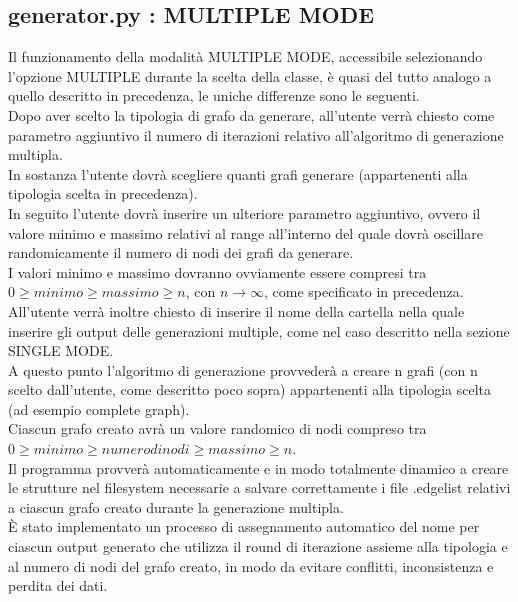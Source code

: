 \subsection{generator.py : MULTIPLE MODE}
\justify
Il funzionamento della modalità MULTIPLE MODE, accessibile selezionando l'opzione MULTIPLE durante la scelta della classe, è quasi del tutto analogo a quello descritto in precedenza, le uniche differenze sono le seguenti.\\

Dopo aver scelto la tipologia di grafo da generare, all'utente verrà chiesto come parametro aggiuntivo il numero di iterazioni relativo all'algoritmo di generazione multipla.\\
In sostanza l'utente dovrà scegliere quanti grafi generare (appartenenti alla tipologia scelta in precedenza).\\

In seguito l'utente dovrà inserire un ulteriore parametro aggiuntivo, ovvero il valore minimo e massimo relativi al range all'interno del quale dovrà oscillare randomicamente il numero di nodi dei grafi da generare.\\
I valori minimo e massimo dovranno ovviamente essere compresi tra \(0 \geq minimo \geq massimo \geq n\), con \(n\to\infty\), come specificato in precedenza.\\

All'utente verrà inoltre chiesto di inserire il nome della cartella nella quale inserire gli output delle generazioni multiple, come nel caso descritto nella sezione SINGLE MODE.\\

A questo punto l'algoritmo di generazione provvederà a creare n grafi (con n scelto dall'utente, come descritto poco sopra) appartenenti alla tipologia scelta (ad esempio complete graph).\\
Ciascun grafo creato avrà un valore randomico di nodi compreso tra \(0 \geq minimo \geq numero di nodi \geq massimo \geq n\).\\

Il programma provverà automaticamente e in modo totalmente dinamico a creare le strutture nel filesystem necessarie a salvare correttamente i file .edgelist relativi a ciascun grafo creato durante la generazione multipla.\\
È stato implementato un processo di assegnamento automatico del nome per ciascun output generato che utilizza il round di iterazione assieme alla tipologia e al numero di nodi del grafo creato, in modo da evitare conflitti, inconsistenza e perdita dei dati.\\

